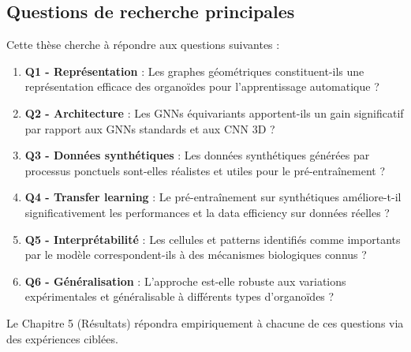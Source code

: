 \subsection{Questions de recherche principales}

Cette thèse cherche à répondre aux questions suivantes :

\begin{enumerate}
    \item \textbf{Q1 - Représentation} : Les graphes géométriques constituent-ils une représentation efficace des organoïdes pour l'apprentissage automatique ?
    
    \item \textbf{Q2 - Architecture} : Les GNNs équivariants apportent-ils un gain significatif par rapport aux GNNs standards et aux CNN 3D ?
    
    \item \textbf{Q3 - Données synthétiques} : Les données synthétiques générées par processus ponctuels sont-elles réalistes et utiles pour le pré-entraînement ?
    
    \item \textbf{Q4 - Transfer learning} : Le pré-entraînement sur synthétiques améliore-t-il significativement les performances et la data efficiency sur données réelles ?
    
    \item \textbf{Q5 - Interprétabilité} : Les cellules et patterns identifiés comme importants par le modèle correspondent-ils à des mécanismes biologiques connus ?
    
    \item \textbf{Q6 - Généralisation} : L'approche est-elle robuste aux variations expérimentales et généralisable à différents types d'organoïdes ?
\end{enumerate}

Le Chapitre 5 (Résultats) répondra empiriquement à chacune de ces questions via des expériences ciblées.
